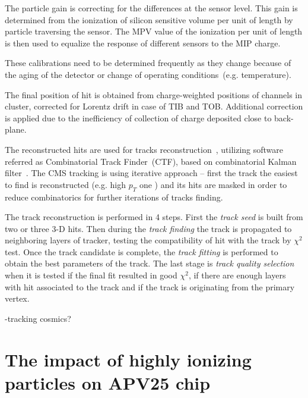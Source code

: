 The particle gain is correcting for the differences at the sensor level. This gain is determined from the ionization of silicon sensitive volume per unit of length by particle traversing the sensor. The MPV value of the ionization per unit of length is then used to equalize the response of different sensors to the MIP charge. 

These calibrations need to be determined frequently as they change because of the aging of the detector or change of operating conditions~(e.g. temperature).

The final position of hit is obtained from charge-weighted positions of channels in cluster, corrected for Lorentz drift in case of TIB and TOB. Additional correction is applied due to the inefficiency of collection of charge deposited close to back-plane.

The reconstructed hits are used for tracks reconstruction~\cite{Chatrchyan:2014fea}, utilizing software referred as Combinatorial Track Finder~(CTF), based on combinatorial Kalman filter~\cite{Fruhwirth:1987fm}. The CMS tracking is using iterative approach -- first the track the easiest to find is reconstructed (e.g. high $p_{T}$ one ) and its hits are masked in order to reduce combinatorics for further iterations of tracks finding.


The track reconstruction is performed in 4 steps. First the \textit{track seed} is built from two or three 3-D hits. Then during the \textit{track finding} the track is propagated to neighboring layers of tracker, testing the compatibility of hit with the track by $\chi^{2}$ test. Once the track candidate is complete, the \textit{track fitting} is performed to obtain the best parameters of the track. The last stage is \textit{track quality selection} when it is tested if the final fit resulted in good $\chi^{2}$, if there are enough layers with hit associated to the track and if the track is originating from the primary vertex.

-tracking cosmics?

\section{The impact of highly ionizing particles on APV25 chip}



